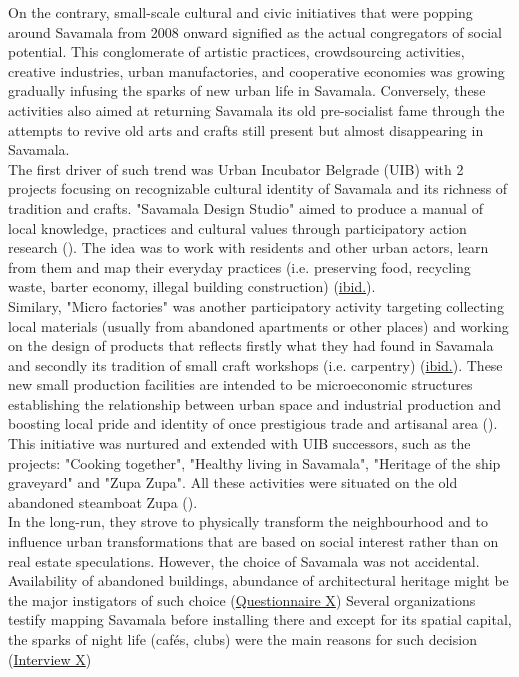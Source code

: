 \documentclass[11pt]{report}
\begin{document}
On the contrary, small-scale cultural and civic initiatives that were popping around Savamala from 2008 onward signified as the actual congregators of social potential.
This conglomerate of artistic practices, crowdsourcing activities, creative industries, urban manufactories, and cooperative economies was growing gradually infusing the sparks of new urban life in Savamala.
Conversely, these activities also aimed at returning Savamala its old pre-socialist fame through the attempts to revive old arts and crafts still present but almost disappearing in Savamala.
\\

The first driver of such trend was Urban Incubator Belgrade (UIB) with 2 projects focusing on recognizable cultural identity of Savamala and its richness of tradition and crafts.
"Savamala Design Studio" aimed to produce a manual of local knowledge, practices and cultural values through participatory action research (\href{Cvetinovic}{\cite{cvetinovic_engine_2013}}).
The idea was to work with residents and other urban actors, learn from them and map their everyday practices (i.e. preserving food, recycling waste, barter economy, illegal building construction) (\href{Cvetinovic}{ibid.}).
\\

Similary, "Micro factories" was another participatory activity targeting collecting local materials (usually from abandoned apartments or other places) and working on the design of products that reflects firstly what they had found in Savamala and secondly its tradition of small craft workshops (i.e. carpentry) (\href{Cvetinovic}{ibid.}). 
These new small production facilities are intended to be microeconomic structures establishing the relationship between urban space and industrial production and boosting local pride and identity of once prestigious trade and artisanal area (\citealt{factories_micro_2013}).
This initiative was nurtured and extended with UIB successors, such as the projects: "Cooking together", "Healthy living in Savamala", "Heritage of the ship graveyard" and "Zupa Zupa".
All these activities were situated on the old abandoned steamboat Zupa (\citealt{belic_parobrod_2014}).
\\

In the long-run, they strove to physically transform the neighbourhood and to influence urban transformations that are based on social interest rather than on real estate speculations. 
However, the choice of Savamala was not accidental.
Availability of abandoned buildings, abundance of architectural heritage might be the major instigators of such choice
(\href{Questionnaire Experts Savamala}{Questionnaire X})
Several organizations testify mapping Savamala before installing there and except for its spatial capital, the sparks of night life (cafés, clubs) were the main reasons for such decision
(\href{InterviewX}{Interview X})
\\
\end{document}
